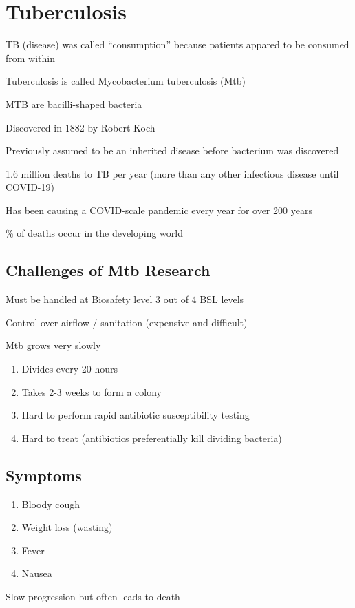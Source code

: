 \documentclass{notes}
\begin{document}
\section*{Tuberculosis}
TB (disease) was called ``consumption'' because patients appared to be consumed from within

Tuberculosis is called Mycobacterium tuberculosis (Mtb)

\tab \indicates MTB are bacilli-shaped bacteria

Discovered in 1882 by Robert Koch

\tab \indicates Previously assumed to be an inherited disease before bacterium was discovered

1.6 million deaths to TB per year (more than any other infectious disease until COVID-19)

\tab \indicates Has been causing a COVID-scale pandemic every year for over 200 years

\tab {}\% of deaths occur in the developing world

\subsection*{Challenges of Mtb Research}
Must be handled at Biosafety level 3 out of 4 BSL levels

\tab \indicates Control over airflow / sanitation (expensive and difficult)

Mtb grows very slowly

\begin{enumerate}
    \item Divides every 20 hours
    \item Takes 2-3 weeks to form a colony
    \item Hard to perform rapid antibiotic susceptibility testing
    \item Hard to treat (antibiotics preferentially kill dividing bacteria)
\end{enumerate}

\subsection*{Symptoms}
\begin{enumerate}
    \item Bloody cough
    \item Weight loss (wasting)
    \item Fever
    \item Nausea
\end{enumerate}
Slow progression but often leads to death
\end{document}
